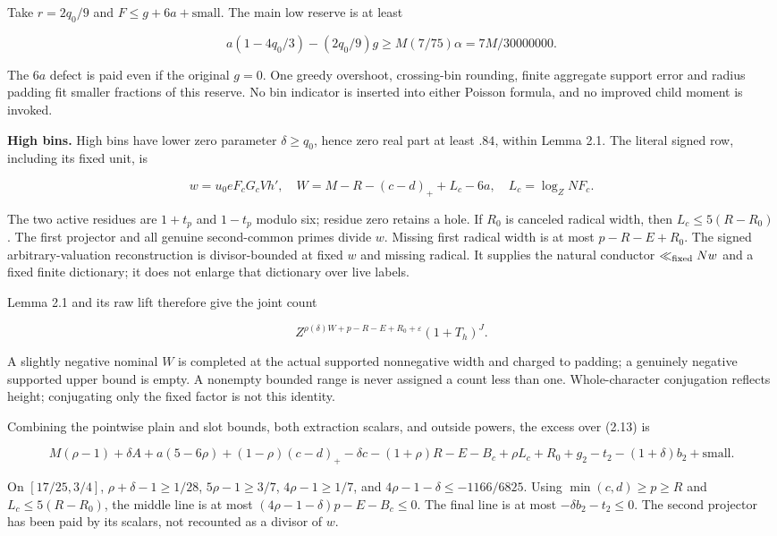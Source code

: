 \documentclass[11pt,a4paper]{article}
\begin{document}
Take \(r=2q_0/9\) and \(F\le g+6a+\text{small}\). The main low reserve
is at least

\[
a(1-4q_0/3)-(2q_0/9)g
\ge M(7/75)\alpha=7M/30000000.
\tag{2.17}
\]

The \(6a\) defect is paid even if the original \(g=0\). One greedy
overshoot, crossing-bin rounding, finite aggregate support error and
radius padding fit smaller fractions of this reserve. No bin indicator
is inserted into either Poisson formula, and no improved child moment is
invoked.

\textbf{High bins.} High bins have lower zero parameter
\(\delta\ge q_0\), hence zero real part at least \(.84\), within Lemma
2.1. The literal signed row, including its fixed unit, is

\[
w=u_0 eF_cG_cVh',\quad
W=M-R-(c-d)_++L_c-6a,\quad L_c=\log_Z NF_c.
\tag{2.18}
\]

The two active residues are \(1+t_p\) and \(1-t_p\) modulo six; residue
zero retains a hole. If \(R_0\) is canceled radical width, then
\(L_c\le5(R-R_0)\). The first projector and all genuine second-common
primes divide \(w\). Missing first radical width is at most
\(p-R-E+R_0\). The signed arbitrary-valuation reconstruction is
divisor-bounded at fixed \(w\) and missing radical. It supplies the
natural conductor \(\ll_{\rm fixed}Nw\) and a fixed finite dictionary;
it does not enlarge that dictionary over live labels.

Lemma 2.1 and its raw lift therefore give the joint count

\[
Z^{\rho(\delta)W+p-R-E+R_0+\varepsilon}(1+T_h)^J.
\tag{2.19}
\]

A slightly negative nominal \(W\) is completed at the actual supported
nonnegative width and charged to padding; a genuinely negative supported
upper bound is empty. A nonempty bounded range is never assigned a count
less than one. Whole-character conjugation reflects height; conjugating
only the fixed factor is not this identity.

Combining the pointwise plain and slot bounds, both extraction scalars,
and outside powers, the excess over (2.13) is

\[
M(\rho-1)+\delta A+a(5-6\rho)
+(1-\rho)(c-d)_+-\delta c-(1+\rho)R-E-B_c+\rho L_c+R_0
+g_2-t_2-(1+\delta)b_2+\text{small}.
\tag{2.20}
\]

On \([17/25,3/4]\), \(\rho+\delta-1\ge1/28\), \(5\rho-1\ge3/7\),
\(4\rho-1\ge1/7\), and \(4\rho-1-\delta\le-1166/6825\). Using
\(\min(c,d)\ge p\ge R\) and \(L_c\le5(R-R_0)\), the middle line is at
most \((4\rho-1-\delta)p-E-B_c\le0\). The final line is at most
\(-\delta b_2-t_2\le0\). The second projector has been paid by its
scalars, not recounted as a divisor of \(w\).
\end{document}
